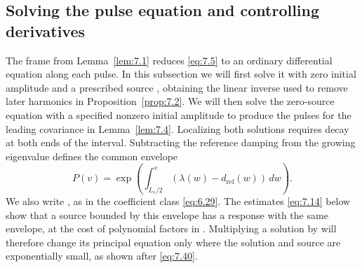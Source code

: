 \subsection{Solving the pulse equation and controlling derivatives}\label{sec:7.2}
The frame  from Lemma~\ref{lem:7.1}
reduces \eqref{eq:7.5} to an ordinary differential equation along each pulse. In this subsection we
will first solve it with zero initial amplitude and a prescribed source , obtaining the
linear inverse used to remove later harmonics in Proposition~\ref{prop:7.2}. We will then solve the
zero-source equation with a specified nonzero initial amplitude to produce the pulses for
the leading covariance in Lemma~\ref{lem:7.4}. Localizing both solutions requires decay at both ends
of the interval. Subtracting the reference damping from the growing eigenvalue defines the
common envelope
\begin{equation}
P(v)=\exp\left(\int_{L_s/2}^{v}(\lambda(w)-d_{\mathrm{ref}}(w))\,dw\right).
\tag{7.12}\label{eq:7.12}
\end{equation}
We also write , as in the coefficient class \eqref{eq:6.29}. The estimates \eqref{eq:7.14} below show
that a source bounded by this envelope has a response with the same envelope, at the cost
of polynomial factors in . Multiplying a solution by  will therefore change its principal
equation only where the solution and source are exponentially small, as shown after \eqref{eq:7.40}.

